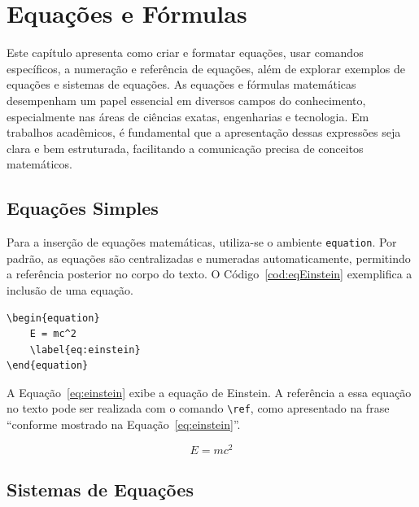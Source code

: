 
\chapter{Equações e Fórmulas}
\label{cap:equacoes}

Este capítulo apresenta como criar e formatar equações, usar comandos específicos, a numeração e referência de equações, além de explorar exemplos de equações e sistemas de equações. As equações e fórmulas matemáticas desempenham um papel essencial em diversos campos do conhecimento, especialmente nas áreas de ciências exatas, engenharias e tecnologia. Em trabalhos acadêmicos, é fundamental que a apresentação dessas expressões seja clara e bem estruturada, facilitando a comunicação precisa de conceitos matemáticos.

\section{Equações Simples}

Para a inserção de equações matemáticas, utiliza-se o ambiente \texttt{equation}. Por padrão, as equações são centralizadas e numeradas automaticamente, permitindo a referência posterior no corpo do texto. O Código~\ref{cod:eqEinstein} exemplifica a inclusão de uma equação.

\begin{codigo}[htb]
\begin{lstlisting}
\begin{equation}
    E = mc^2
    \label{eq:einstein}
\end{equation}
\end{lstlisting}
\fonteautor
\end{codigo}

A Equação~\eqref{eq:einstein} exibe a equação de Einstein. A referência a essa equação no texto pode ser realizada com o comando \texttt{\textbackslash ref}, como apresentado na frase ``conforme mostrado na Equação~\ref{eq:einstein}''.

\begin{equation}
    E = mc^2
    \label{eq:einstein}
\end{equation}

\section{Sistemas de Equações}

